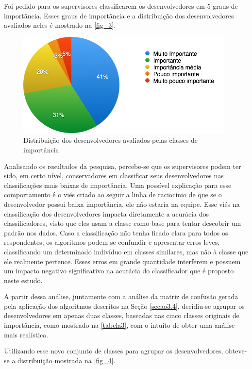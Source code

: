 Foi pedido para os supervisores classificarem os desenvolvedores em 5 graus de importância. Esses graus de importância e a distribuição dos desenvolvedores avaliados neles é mostrado na \autoref{fig_3}.

\begin{figure}[h]
	\centering
	\includegraphics[scale=0.8]{figs/geral/imagem-classe-original.png}
	\caption{\label{fig_3}Distribuição dos desenvolvedores avaliados pelas classes de importância}
\end{figure}

Analisando os resultados da pesquisa, percebe-se que os supervisores podem ter sido, em certo nível, conservadores em classificar seus desenvolvedores nas classificações mais baixas de importância. Uma possível explicação para esse comportamento é o viés criado ao seguir a linha de raciocínio de que se o desenvolvedor possui baixa importância, ele não estaria na equipe.
Esse viés na classificação dos desenvolvedores impacta diretamente a acurácia dos classificadores, visto que eles usam a classe como base para tentar descobrir um padrão nos dados. Caso a classificação não tenha ficado clara para todos os respondentes, os algoritmos podem se confundir e apresentar erros leves, classificando um determinado indivíduo em classes similares, mas não à classe que ele realmente pertence. Esses erros em grande quantidade interferem e possuem um impacto negativo significativo na acurácia do classificador que é proposto neste estudo.

A partir dessa análise, juntamente com a análise da matriz de confusão gerada pela aplicação dos algoritmos descritos na Seção \ref{secao3.4}, decidiu-se agrupar os desenvolvedores em apenas duas classes, baseadas nas cinco classes originais de importância, como mostrado na \autoref{tabela3}, com o intuito de obter uma análise mais realística.

Utilizando esse novo conjunto de classes para agrupar os desenvolvedores, obteve-se a distribuição mostrada na \autoref{fig_4}.

